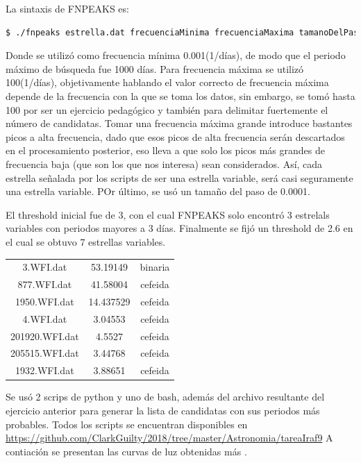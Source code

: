 \documentclass[12pt]{article}
\begin{document}
La sintaxis de FNPEAKS es:
\begin{lstlisting}[language=bash]
$ ./fnpeaks estrella.dat frecuenciaMinima frecuenciaMaxima tamanoDelPaso
\end{lstlisting}
Donde se utilizó como frecuencia mínima 0.001(1/días), de modo que el periodo máximo de búsqueda fue 1000 días. Para frecuencia máxima se utilizó 100(1/días), objetivamente hablando el valor correcto de frecuencia máxima depende de la frecuencia con la que se toma los datos, sin embargo, se tomó hasta 100 por ser un ejercicio pedagógico y también para delimitar fuertemente el número de candidatas. Tomar una frecuencia máxima grande introduce bastantes picos a alta frecuencia, dado que esos picos de alta frecuencia serán descartados en el procesamiento posterior,  eso lleva a que solo los picos más grandes de frecuencia baja (que son los que nos interesa) sean considerados. Así, cada estrella señalada por los scripts de ser una estrella variable, será casi seguramente una estrella variable. POr último, se usó un tamaño del paso de 0.0001.

El threshold inicial fue de 3, con el cual FNPEAKS solo encontró 3 estrelals variables con periodos mayores a 3 días. Finalmente se fijó un threshold de 2.6 en el cual se obtuvo 7 estrellas variables.



\begin{table}[htb]
    \centering
    \label{tabla}
	\begin{tabular}{|c|c|c| }
	\hline
	3.WFI.dat & 53.19149 & binaria \\
	877.WFI.dat & 41.58004 & cefeida\\
	1950.WFI.dat & 14.437529 & cefeida \\
	4.WFI.dat & 3.04553  & cefeida  \\
	201920.WFI.dat & 4.5527 & cefeida \\
	205515.WFI.dat & 3.44768 &cefeida \\
	1932.WFI.dat & 3.88651 & cefeida\\
\hline
	\end{tabular}
\end{table}


Se usó 2 scrips de python y uno de bash, además del archivo resultante del ejercicio anterior  para generar la lista de candidatas con sus periodos más probables. 
Todos los scripts se encuentran disponibles en \url{https://github.com/ClarkGuilty/2018/tree/master/Astronomia/tareaIraf9}
A contiación se presentan las curvas de luz obtenidas más .
\end{document}
